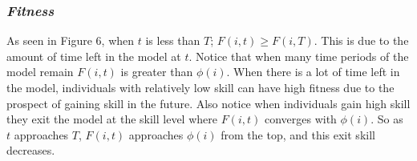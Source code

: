 \documentclass[12pt, letterpaper, fleqn]{article}
\begin{document}
         
      
      
      
      

    \subsubsection*{\it Fitness}      
      As seen in Figure 6, when $t$ is less than $T$; $F(i,t) \ge F(i,T)$.
      This is due to the amount of time left in the model at $t$.
      Notice that when many time periods of the model remain $F(i,t)$ is greater than $\phi(i)$. %
      When there is a lot of time left in the model, individuals with relatively low skill can have high fitness due to the prospect of gaining skill in the future.    
      Also notice when individuals gain high skill they exit the model at the skill level where $F(i,t)$ converges with $\phi(i)$.
      So as $t$ approaches $T$, $F(i,t)$ approaches $\phi(i)$ from the top, and this exit skill decreases.


      
      
\end{document}
